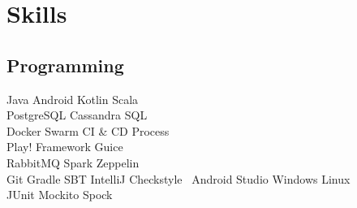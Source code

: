 \documentclass[]{deedy-resume-openfont}
\begin{document}
\begin{minipage}[t]{0.33\textwidth}
%


\section{Skills}
\subsection{Programming}
Java \textbullet{}   
Android \textbullet{} 
Kotlin \textbullet{} 
Scala \\
PostgreSQL \textbullet{}   
Cassandra \textbullet{} 
SQL \\
Docker \textbullet{} 
Swarm \textbullet{} 
CI \& CD Process\\
Play! Framework \textbullet{} 
Guice \\
RabbitMQ \textbullet{} 
Spark \textbullet{}
Zeppelin \\
Git \textbullet{} 
Gradle \textbullet{} 
SBT \textbullet{}
IntelliJ \textbullet{}
Checkstyle \
Android Studio \textbullet{} 
Windows \textbullet{} 
Linux \\
JUnit \textbullet{} 
Mockito \textbullet{} 
Spock \\
\sectionsep

\end{minipage}
\end{document}

